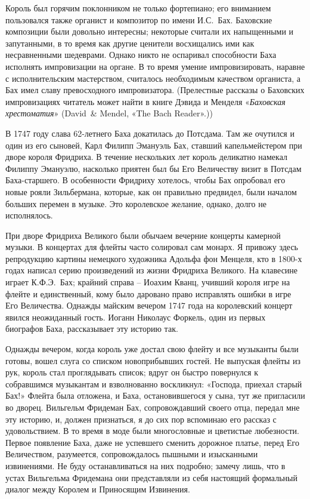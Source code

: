 \documentclass[../main.tex]{subfiles}
\begin{document}
Король был горячим поклонником не только фортепиано; его вниманием пользовался также органист и композитор по имени И.С.~Бах. Баховские композиции были довольно интересны; некоторые считали их напыщенными и запутанными, в то время как другие ценители восхищались ими как несравненными шедеврами. Однако никто не оспаривал способности Баха исполнять импровизации на органе. В то время умение импровизировать, наравне с исполнительским мастерством, считалось необходимым качеством органиста, а Бах имел славу превосходного импровизатора. (Прелестные рассказы о Баховских импровизациях читатель может найти в книге Дэвида и Менделя «\emph{Баховская хрестоматия}» (David~\& Mendel, «The Bach Reader».))

В 1747 году слава 62-летнего Баха докатилась до Потсдама. Там же очутился и один из его сыновей, Карл Филипп Эмануэль Бах, ставший капельмейстером при дворе короля Фридриха. В течение нескольких лет король деликатно намекал Филиппу Эмануэлю, насколько приятен был бы Его Величеству визит в Потсдам Баха-старшего. В особенности Фридриху хотелось, чтобы Бах опробовал его новые рояли Зильбермана, которые, как он правильно предвидел, были началом больших перемен в музыке. Это королевское желание, однако, долго не исполнялось.

При дворе Фридриха Великого были обычаем вечерние концерты камерной музыки. В концертах для флейты часто солировал сам монарх. Я привожу здесь репродукцию картины немецкого художника Адольфа фон Менцеля, кто в 1800-х годах написал серию произведений из жизни Фридриха Великого. На клавесине играет К.Ф.Э.~Бах; крайний справа \--- Иоахим Кванц, учивший короля игре на флейте и единственный, кому было даровано право исправлять ошибки в игре Его Величества. Однажды майским вечером 1747 года на королевский концерт явился неожиданный гость. Иоганн Николаус Форкель, один из первых биографов Баха, рассказывает эту историю так.

Однажды вечером, когда король уже достал свою флейту и все музыканты были готовы, вошел слуга со списком новоприбывших гостей. Не выпуская флейты из рук, король стал проглядывать список; вдруг он быстро повернулся к собравшимся музыкантам и взволнованно воскликнул: «Господа, приехал старый Бах!» Флейта была отложена, и Баха, остановившегося у сына, тут же пригласили во дворец. Вильгельм Фридеман Бах, сопровождавший своего отца, передал мне эту историю, и, должен признаться, я до сих пор вспоминаю его рассказ с удовольствием. В то время в моде были многословные и цветистые любезности. Первое появление Баха, даже не успевшего сменить дорожное платье, перед Его Величеством, разумеется, сопровождалось пышными и изысканными извинениями. Не буду останавливаться на них подробно; замечу лишь, что в устах Вильгельма Фридемана они представляли из себя настоящий формальный диалог между Королем и Приносящим Извинения.
\end{document}
